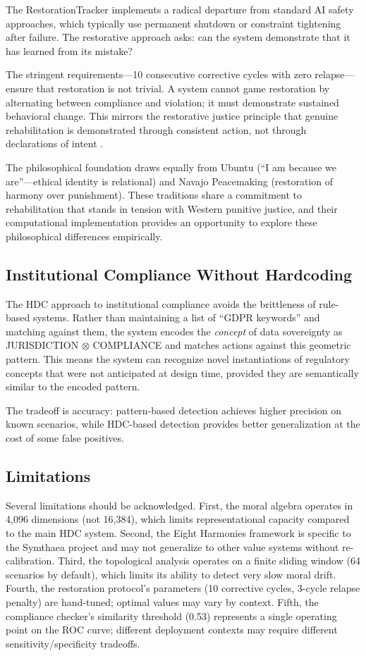\documentclass[11pt,a4paper]{article}
\begin{document}
The RestorationTracker implements a radical departure from standard AI safety approaches, which typically use permanent shutdown or constraint tightening after failure. The restorative approach asks: can the system demonstrate that it has learned from its mistake?

The stringent requirements---10 consecutive corrective cycles with zero relapse---ensure that restoration is not trivial. A system cannot game restoration by alternating between compliance and violation; it must demonstrate sustained behavioral change. This mirrors the restorative justice principle that genuine rehabilitation is demonstrated through consistent action, not through declarations of intent \citep{zehr2002}.

The philosophical foundation draws equally from Ubuntu (``I am because we are''---ethical identity is relational) and Navajo Peacemaking (restoration of harmony over punishment). These traditions share a commitment to rehabilitation that stands in tension with Western punitive justice, and their computational implementation provides an opportunity to explore these philosophical differences empirically.

\subsection{Institutional Compliance Without Hardcoding}

The HDC approach to institutional compliance avoids the brittleness of rule-based systems. Rather than maintaining a list of ``GDPR keywords'' and matching against them, the system encodes the \emph{concept} of data sovereignty as JURISDICTION $\otimes$ COMPLIANCE and matches actions against this geometric pattern. This means the system can recognize novel instantiations of regulatory concepts that were not anticipated at design time, provided they are semantically similar to the encoded pattern.

The tradeoff is accuracy: pattern-based detection achieves higher precision on known scenarios, while HDC-based detection provides better generalization at the cost of some false positives.

\subsection{Limitations}

Several limitations should be acknowledged. First, the moral algebra operates in 4,096 dimensions (not 16,384), which limits representational capacity compared to the main HDC system. Second, the Eight Harmonies framework is specific to the Symthaea project and may not generalize to other value systems without re-calibration. Third, the topological analysis operates on a finite sliding window (64 scenarios by default), which limits its ability to detect very slow moral drift. Fourth, the restoration protocol's parameters (10 corrective cycles, 3-cycle relapse penalty) are hand-tuned; optimal values may vary by context. Fifth, the compliance checker's similarity threshold (0.53) represents a single operating point on the ROC curve; different deployment contexts may require different sensitivity/specificity tradeoffs.
\end{document}
